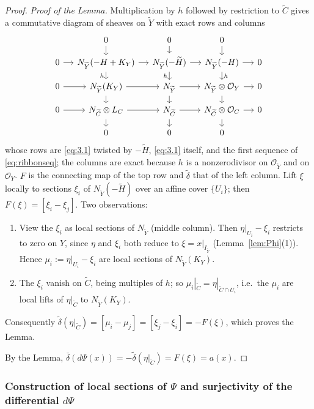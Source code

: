 \documentclass[11pt,reqno]{amsart}
\theoremstyle{plain}
\theoremstyle{definition}
\newcommand{\OO}{\mathcal{O}}
\newcommand{\Yt}{\widetilde{Y}}
\newcommand{\Ht}{\widetilde{H}}
\newcommand{\Ct}{\widetilde{C}}
\newcommand{\NYt}{N_{\Yt}}
\begin{document}
\begin{proof}
\emph{Proof of the Lemma.} Multiplication by $h$ followed by restriction to $\Ct$ gives a commutative diagram of sheaves on $\Yt$ with exact rows and columns
\begin{equation}\label{diag:3x3}
\begin{tikzcd}[row sep=small, column sep=small]
& 0\arrow[d] & 0\arrow[d] & 0\arrow[d] & \\
0\arrow[r] & \NYt(-H+K_Y)\arrow[r]\arrow[d,"h"'] & \NYt(-\Ht)\arrow[r]\arrow[d,"h"'] & \NYt(-H)\arrow[r]\arrow[d,"h"] & 0\\
0\arrow[r] & \NYt(K_Y)\arrow[r]\arrow[d] & \NYt\arrow[r]\arrow[d] & \NYt\otimes\OO_Y\arrow[r]\arrow[d] & 0\\
0\arrow[r] & N_{\Ct}\otimes L_C\arrow[r]\arrow[d] & N_{\Ct}\arrow[r]\arrow[d] & N_{\Ct}\otimes\OO_C\arrow[r]\arrow[d] & 0\\
& 0 & 0 & 0 &
\end{tikzcd}
\end{equation}
whose rows are \eqref{eq:3.1} twisted by $-\Ht$, \eqref{eq:3.1} itself, and the first sequence of \eqref{eq:ribbonseq}; the columns are exact because $h$ is a nonzerodivisor on $\OO_{\Yt}$ and on $\OO_Y$. $F$ is the connecting map of the top row and $\tilde\delta$ that of the left column. Lift $\xi$ locally to sections $\xi_i$ of $\NYt(-\Ht)$ over an affine cover $\{U_i\}$; then $F(\xi)=[\xi_i-\xi_j]$. Two observations:
\begin{enumerate}
\item[(a)] View the $\xi_i$ as local sections of $\NYt$ (middle column). Then $\eta|_{U_i}-\xi_i$ restricts to zero on $Y$, since $\eta$ and $\xi_i$ both reduce to $\xi=x|_{I_{\Yt}}$ (Lemma~\ref{lem:Phi}(1)). Hence $\mu_i:=\eta|_{U_i}-\xi_i$ are local sections of $\NYt(K_Y)$.
\item[(b)] The $\xi_i$ vanish on $\Ct$, being multiples of $h$; so $\mu_i|_{\Ct}=\eta|_{\Ct\cap U_i}$, i.e.\ the $\mu_i$ are local lifts of $\eta|_{\Ct}$ to $\NYt(K_Y)$.
\end{enumerate}
Consequently $\tilde\delta(\eta|_{\Ct})=[\mu_i-\mu_j]=[\xi_j-\xi_i]=-F(\xi)$, which proves the Lemma.

By the Lemma, $\bar\delta(d\Psi(x))=-\tilde\delta(\eta|_{\Ct})=F(\xi)=a(x)$.
\end{proof}

\subsubsection{Construction of local sections of \texorpdfstring{$\Psi$}{Psi} and surjectivity of the differential \texorpdfstring{$d\Psi$}{dPsi}}\label{subsec:sections}
\end{document}
